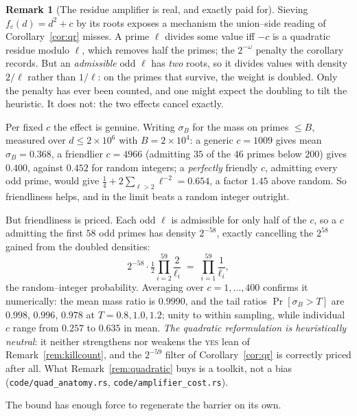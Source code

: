 \documentclass[11pt]{article}
\theoremstyle{definition}
\newtheorem{remark}[theorem]{Remark}
\begin{document}
\begin{remark}[The residue amplifier is real, and exactly paid for]\label{rem:amplifier}
Sieving $f_c(d)=d^2+c$ by its roots exposes a mechanism the union--side reading of
Corollary~\ref{cor:qr} misses. A prime $\ell$ divides some value iff $-c$ is a quadratic residue
modulo $\ell$, which removes half the primes; the $2^{-\omega}$ penalty the corollary records.
But an \emph{admissible} odd $\ell$ has \emph{two} roots, so it divides values with density
$2/\ell$ rather than $1/\ell$: on the primes that survive, the weight is doubled. Only the penalty
has ever been counted, and one might expect the doubling to tilt the heuristic. It does not: the
two effects cancel exactly.

Per fixed $c$ the effect is genuine. Writing $\sigma_B$ for the mass on primes $\le B$, measured
over $d\le2\times10^6$ with $B=2\times10^4$: a generic $c=1009$ gives mean $\sigma_B=0.368$, a
friendlier $c=4966$ (admitting $35$ of the $46$ primes below $200$) gives $0.400$, against $0.452$
for random integers; a \emph{perfectly} friendly $c$, admitting every odd prime, would give
$\tfrac14+2\sum_{\ell>2}\ell^{-2}=0.654$, a factor $1.45$ above random. So friendliness helps, and
in the limit beats a random integer outright.

But friendliness is priced. Each odd $\ell$ is admissible for only half of the $c$, so a $c$
admitting the first $58$ odd primes has density $2^{-58}$, exactly cancelling the $2^{58}$ gained
from the doubled densities:
\[ 2^{-58}\cdot\tfrac12\prod_{i=2}^{59}\frac2{\ell_i}\;=\;\prod_{i=1}^{59}\frac1{\ell_i}, \]
the random--integer probability. Averaging over $c=1,\dots,400$ confirms it numerically: the mean
mass ratio is $0.9990$, and the tail ratios $\Pr[\sigma_B>T]$ are $0.998$, $0.996$, $0.978$ at
$T=0.8,1.0,1.2$; unity to within sampling, while individual $c$ range from $0.257$ to $0.635$
in mean. \emph{The quadratic reformulation is heuristically neutral}: it neither strengthens nor
weakens the \textsc{yes} lean of Remark~\ref{rem:killcount}, and the $2^{-59}$ filter of
Corollary~\ref{cor:qr} is correctly priced after all. What
Remark~\ref{rem:quadratic} buys is a toolkit, not a bias (\texttt{code/quad\_anatomy.rs},
\texttt{code/amplifier\_cost.rs}).
\end{remark}

The bound has enough force to regenerate the barrier on its own.
\end{document}
